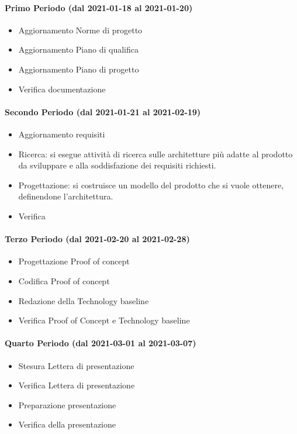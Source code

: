 \paragraph{Primo Periodo (dal 2021-01-18 al 2021-01-20)}
\begin{itemize}
	\item Aggiornamento Norme di progetto
	\item Aggiornamento Piano di qualifica
	\item Aggiornamento Piano di progetto
	\item Verifica documentazione
\end{itemize}

\paragraph{Secondo Periodo (dal 2021-01-21 al 2021-02-19)}
\begin{itemize}
	\item Aggiornamento requisiti
	\item Ricerca: si esegue attività di ricerca sulle architetture più adatte al prodotto da sviluppare e alla soddisfazione dei requisiti richiesti.
	\item Progettazione: si costruisce un modello del prodotto che si vuole ottenere, definendone l'architettura.
	\item Verifica
\end{itemize}

\paragraph{Terzo Periodo (dal 2021-02-20 al 2021-02-28)}
\begin{itemize}
	\item Progettazione Proof of concept
	\item Codifica Proof of concept
	\item Redazione della Technology baseline
	\item Verifica Proof of Concept e Technology baseline
\end{itemize}

\paragraph{Quarto Periodo (dal 2021-03-01 al 2021-03-07)}
\begin{itemize}
	\item Stesura Lettera di presentazione
	\item Verifica Lettera di presentazione
	\item Preparazione presentazione
	\item Verifica della presentazione
\end{itemize}

